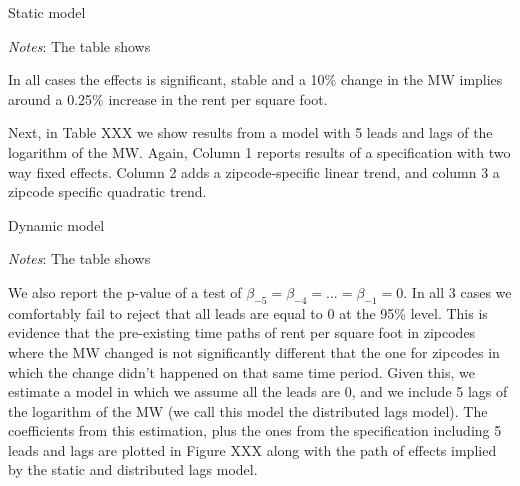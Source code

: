     \begin{table}[h!] \centering
        \caption{Static model}
        \label{tab:fd_table}
        \scalebox{0.85}{
        }
        \begin{minipage}{.95\textwidth} \footnotesize
			\vspace{3mm} 
			\textit{Notes}: The table shows
		\end{minipage}
    \end{table}
    
    
    In all cases the effects is significant, stable and a 10\% change in the MW implies around a 0.25\% increase in the rent per square foot. 
    
    Next, in Table XXX we show results from a model with 5 leads and lags of the logarithm of the MW. Again, Column 1 reports results of a specification with two way fixed effects. Column 2 adds a zipcode-specific linear trend, and column 3 a zipcode specific quadratic trend. 
    
    \begin{table}[h!] \centering
        \caption{Dynamic model}
        \label{tab:fd_table}
        \scalebox{0.85}{
        }
        \begin{minipage}{.95\textwidth} \footnotesize
			\vspace{3mm} 
			\textit{Notes}: The table shows
		\end{minipage}
    \end{table}
    
    We also report the p-value of a test of $\beta_{-5} = \beta_{-4} = ... = \beta_{-1} = 0$. In all 3 cases we comfortably fail to reject that all leads are equal to 0 at the 95\% level. This is evidence that the pre-existing time paths of rent per square foot in zipcodes where the MW changed is not significantly different that the one for zipcodes in which the change didn't happened on that same time period. Given this, we estimate a model in which we assume all the leads are 0, and we include 5 lags of the logarithm of the MW (we call this model the distributed lags model). The coefficients from this estimation, plus the ones from the specification including 5 leads and lags are plotted in Figure XXX along with the path of effects implied by the static and distributed lags model. 
    
